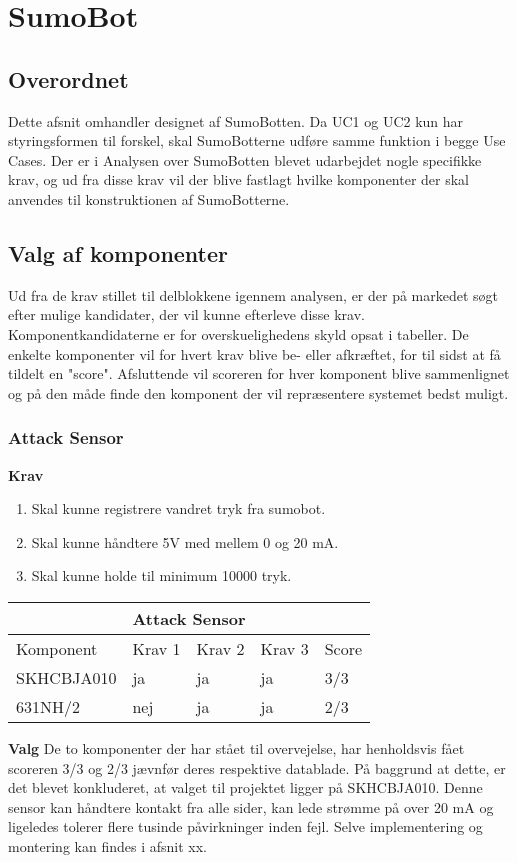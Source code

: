\section{SumoBot}\label{sec:SumoBot:design}

\subsection{Overordnet}

Dette afsnit omhandler designet af SumoBotten. Da UC1 og UC2 kun har styringsformen til forskel, skal SumoBotterne udføre samme funktion i begge Use Cases.
Der er i Analysen over SumoBotten blevet udarbejdet nogle specifikke krav, og ud fra disse krav vil der blive fastlagt hvilke komponenter der skal anvendes til konstruktionen af SumoBotterne. 

\subsection{Valg af komponenter}

Ud fra de krav stillet til delblokkene igennem analysen, er der på markedet søgt efter mulige kandidater, der vil kunne efterleve disse krav. Komponentkandidaterne er for overskuelighedens skyld opsat i tabeller. De enkelte komponenter vil for hvert krav blive be- eller afkræftet, for til sidst at få tildelt en "score". Afsluttende vil scoreren for hver komponent blive sammenlignet og på den måde finde den komponent der vil repræsentere systemet bedst muligt.

\subsubsection{Attack Sensor}
\textbf{Krav}
\begin{enumerate}
\item Skal kunne registrere vandret tryk fra sumobot.
\item Skal kunne håndtere 5V med mellem 0 og 20 mA.
\item Skal kunne holde til minimum 10000 tryk.
\end{enumerate}
\begin{center}
\begin{tabular}{|p{2.5cm}||p{1.3cm}|p{1.3cm}|p{1.3cm}|p{1cm}|}
 \hline
 \multicolumn{5}{|c|}{Attack Sensor} \\
 \hline
 Komponent & Krav 1 & Krav 2 & Krav 3 & Score\\
 \hline
 SKHCBJA010 & ja & ja & ja & 3/3\\
 631NH/2 & nej & ja & ja & 2/3\\
 \hline
\end{tabular}
\end{center}
\textbf{Valg}
De to komponenter der har stået til overvejelse, har henholdsvis fået scoreren 3/3 og 2/3 jævnfør deres respektive datablade. På baggrund at dette, er det blevet konkluderet, at valget til projektet ligger på SKHCBJA010. Denne sensor kan håndtere kontakt fra alle sider, kan lede strømme på over 20 mA og ligeledes tolerer flere tusinde påvirkninger inden fejl. Selve implementering og montering kan findes i afsnit xx.

